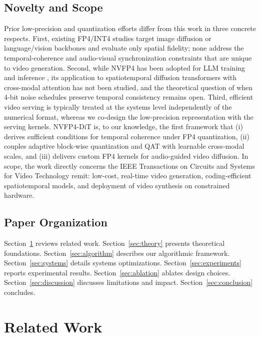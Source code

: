 \documentclass[journal,twoside]{IEEEtran}
\theoremstyle{definition}
\theoremstyle{remark}
\begin{document}
\subsection{Novelty and Scope}
Prior low-precision and quantization efforts differ from this work in three concrete respects. First, existing FP4/INT4 studies target image diffusion or language/vision backbones \cite{zhao2023fp4, li2023efficientdm, bondarenko2024understanding} and evaluate only spatial fidelity; none address the temporal-coherence and audio-visual synchronization constraints that are unique to video generation. Second, while NVFP4 has been adopted for LLM training and inference \cite{nvidia2024nvfp4, dettmers2023qlora}, its application to spatiotemporal diffusion transformers with cross-modal attention has not been studied, and the theoretical question of when 4-bit noise schedules preserve temporal consistency remains open. Third, efficient video serving is typically treated at the systems level \cite{kwon2023efficient, nvidia2024tensorrt} independently of the numerical format, whereas we co-design the low-precision representation with the serving kernels. NVFP4-DiT is, to our knowledge, the first framework that (i) derives sufficient conditions for temporal coherence under FP4 quantization, (ii) couples adaptive block-wise quantization and QAT with learnable cross-modal scales, and (iii) delivers custom FP4 kernels for audio-guided video diffusion. In scope, the work directly concerns the IEEE Transactions on Circuits and Systems for Video Technology remit: low-cost, real-time video generation, coding-efficient spatiotemporal models, and deployment of video synthesis on constrained hardware.

\subsection{Paper Organization}
Section~\ref{sec:related} reviews related work. Section~\ref{sec:theory} presents theoretical foundations. Section~\ref{sec:algorithm} describes our algorithmic framework. Section~\ref{sec:systems} details systems optimizations. Section~\ref{sec:experiments} reports experimental results. Section~\ref{sec:ablation} ablates design choices. Section~\ref{sec:discussion} discusses limitations and impact. Section~\ref{sec:conclusion} concludes.

\section{Related Work}
\label{sec:related}
\end{document}

